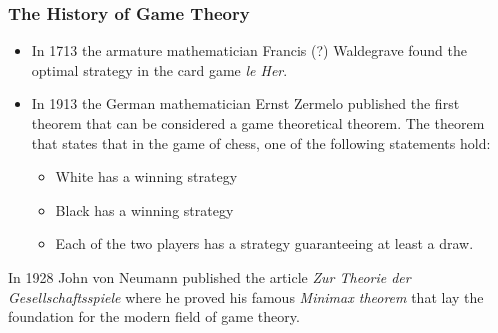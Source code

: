 \documentclass{beamer}
\begin{document}
\begin{frame}
  
\frametitle{The History of Game Theory}

\begin{itemize}
\item In 1713 the armature mathematician Francis (?) Waldegrave found the optimal strategy in the card game \emph{le Her}.
  \item In 1913 the German mathematician Ernst Zermelo  published
the first theorem that can be considered a game theoretical
theorem. The theorem that states that in the game of chess, one of the following statements hold:
\begin{itemize}
\item White has a winning strategy
\item Black has a winning strategy
  \item Each of the two players has a strategy guaranteeing at least a
    draw.
  \end{itemize}
\end{itemize}

In 1928 John von Neumann published the article \emph{Zur
      Theorie der Gesellschaftsspiele} where he proved his famous
    \emph{Minimax theorem} that lay the foundation for the modern
    field of game theory. 
\end{frame}
\end{document}
